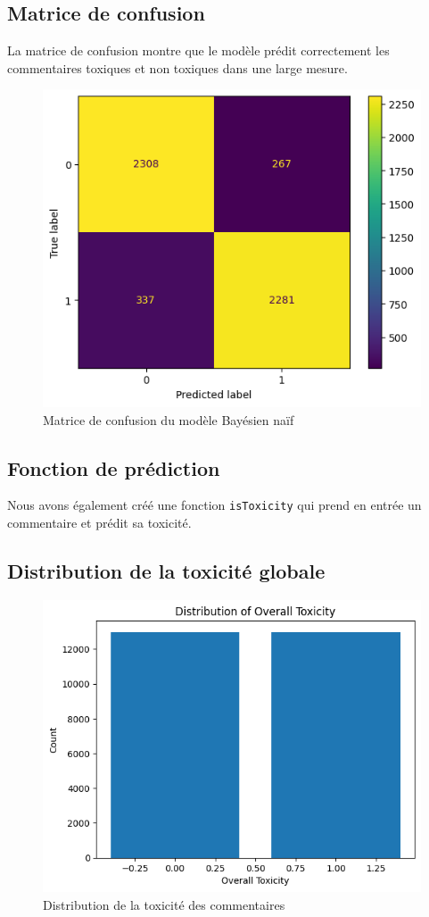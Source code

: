 \subsection{Matrice de confusion}

La matrice de confusion montre que le modèle prédit correctement les commentaires toxiques et non toxiques dans une large mesure.

\begin{figure}[h]
    \centering
    \includegraphics[width=.49\linewidth]{figures/matrix-confusion-naive_bayes.png}
    \caption{Matrice de confusion du modèle Bayésien naïf}
\end{figure}

\subsection{Fonction de prédiction}

Nous avons également créé une fonction \texttt{isToxicity} qui prend en entrée un commentaire et prédit sa toxicité.

\subsection{Distribution de la toxicité globale}

\begin{figure}[h]
    \centering
    \includegraphics[width=.47\linewidth]{figures/distribution-toxicity-naive_bayes.png}
    \caption{Distribution de la toxicité des commentaires}
\end{figure}



